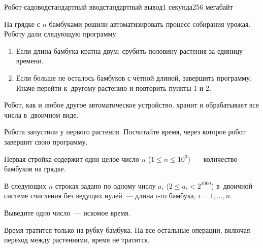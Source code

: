 \begin{problem}{Робот-садовод}{стандартный ввод}{стандартный вывод}{1 секунда}{256 мегабайт}

На грядке с $n$ бамбуками решили автоматизировать процесс собирания урожая. Роботу дали следующую программу:
\begin{enumerate}
  \item Если длина бамбука кратна двум: срубить половину растения за единицу времени.
  \item Если больше не осталось бамбуков с чётной длиной, завершить программу. Иначе перейти к~другому растению и повторить пункты 1 и 2.
\end{enumerate}

Робот, как и любое другое автоматическое устройство, хранит и обрабатывает все числа в~двоичном виде.

Робота запустили у первого растения. Посчитайте время, через которое робот завершит свою программу.



\InputFile
Первая стройка содержит одно целое число $n$ ($1 \leq n \leq 10^3$)~--- количество бамбуков на грядке.

В следующих $n$ строках задано по одному числу $a_i$ ($2 \leq a_i < 2^{1000}$) в~двоичной системе счисления без ведущих нулей~--- длина $i$-го бамбука, $i = 1, \dots, n$.

\OutputFile
Выведите одно число~--- искомое время.

\Example

\begin{example}
%
\end{example}

\Note
Время тратится только на рубку бамбука. На все остальные операции, включая переход между растениями, время не тратится.

\end{problem}

